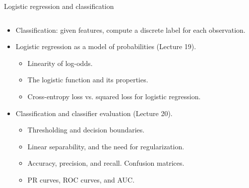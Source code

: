 \documentclass[aspectratio=169]{../latex_main/tntbeamer}  %
\begin{document}
	\begin{frame}{Logistic regression and classification}
	          \begin{columns}
	            \begin{column}{.6\textwidth}
	            \begin{itemize}
	                \item Classification: given features, compute a discrete label for each observation.
	                \item Logistic regression as a model of probabilities (Lecture 19).
	                \begin{itemize}
	                    \item Linearity of log-odds.
	                    \item The logistic function and its properties.
	                    \item Cross-entropy loss vs. squared loss for logistic regression.
	                \end{itemize}
	                \item Classification and classifier evaluation (Lecture 20).
	                \begin{itemize}
	                    \item Thresholding and decision boundaries.
	                    \item Linear separability, and the need for regularization.
	                    \item Accuracy, precision, and recall. Confusion matrices.
	                    \item PR curves, ROC curves, and AUC.
	                \end{itemize}
	            \end{itemize}
	            \end{column}
	            

\end{columns}
\end{frame}
\end{document}
